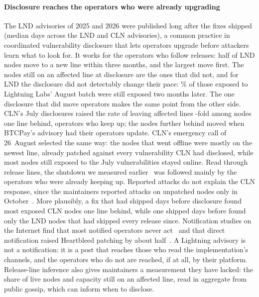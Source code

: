\paragraph{Disclosure reaches the operators who were already upgrading}
The LND advisories of 2025 and 2026 were published long after the fixes shipped (median \FixToDiscMedian{} days across
the LND and CLN advisories), a common practice in coordinated vulnerability disclosure that lets operators upgrade
before attackers learn what to look for. It works for
the operators who follow releases: half of LND nodes move to a new line within three months, and the largest move
first. The nodes still on an affected line at disclosure are the ones that did not, and for LND the disclosure did not
detectably change their pace: \PctCohortStillLLBatch\% of those exposed to Lightning Labs' August batch were still exposed two
months later. The one disclosure that did move operators makes the same point from the other side. CLN's July
disclosures raised the rate of leaving affected lines \RROpClnRecent-fold among nodes one line behind, operators who
keep up; the nodes further behind moved when BTCPay's advisory had their operators update. CLN's emergency call of
26~August selected the same way: the nodes that went offline were mostly on the newest line, already patched against
every vulnerability CLN had disclosed, while most nodes still exposed to the July vulnerabilities stayed online. Read
through release lines, the shutdown we measured earlier~\cite{kumar2026clientdiversity} was followed mainly by the
operators who were already keeping up.
Reported attacks do not
explain the CLN response, since the maintainers reported attacks on unpatched nodes only in
October~\cite{coreln2026attacks}. More plausibly, a fix that had shipped \FixToDiscClnGossipd{} days before disclosure
found most exposed CLN nodes one line behind, while one shipped \FixToDiscLLBatch{} days before found only the LND
nodes that had skipped every release since. Notification studies on the Internet find that most notified operators
never act~\cite{li2016notifications} and that direct notification raised Heartbleed patching by about
half~\cite{durumeric2014heartbleed}. A Lightning advisory is not a notification: it is a post that reaches those who
read the implementation's channels, and the operators who do not are reached, if at all, by their platform.
Release-line inference also gives maintainers a measurement they have lacked: the share of live nodes and capacity
still on an affected line, read in aggregate from public gossip, which can inform when to disclose.

